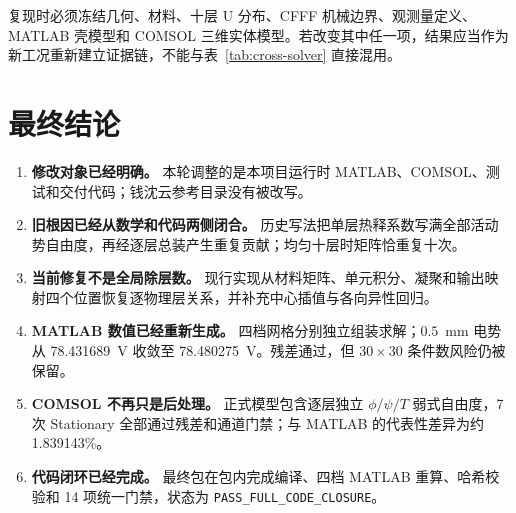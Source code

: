 \documentclass[UTF8,fontset=windows,12pt,a4paper]{ctexart}
\begin{document}
复现时必须冻结几何、材料、十层 U 分布、CFFF 机械边界、观测量定义、MATLAB 壳模型和 COMSOL 三维实体模型。若改变其中任一项，结果应当作为新工况重新建立证据链，不能与表~\ref{tab:cross-solver} 直接混用。

\section{最终结论}

\begin{enumerate}[leftmargin=2.7em]
  \item \textbf{修改对象已经明确。} 本轮调整的是本项目运行时 MATLAB、COMSOL、测试和交付代码；钱沈云参考目录没有被改写。
  \item \textbf{旧根因已经从数学和代码两侧闭合。} 历史写法把单层热释系数写满全部活动势自由度，再经逐层总装产生重复贡献；均匀十层时矩阵恰重复十次。
  \item \textbf{当前修复不是全局除层数。} 现行实现从材料矩阵、单元积分、凝聚和输出映射四个位置恢复逐物理层关系，并补充中心插值与各向异性回归。
  \item \textbf{MATLAB 数值已经重新生成。} 四档网格分别独立组装求解；$0.5$~mm 电势从 78.431689~V 收敛至 78.480275~V。残差通过，但 $30\times30$ 条件数风险仍被保留。
  \item \textbf{COMSOL 不再只是后处理。} 正式模型包含逐层独立 $\phi/\psi/T$ 弱式自由度，7 次 Stationary 全部通过残差和通道门禁；与 MATLAB 的代表性差异为约 1.839143\%。
  \item \textbf{代码闭环已经完成。} 最终包在包内完成编译、四档 MATLAB 重算、哈希校验和 14 项统一门禁，状态为 \texttt{PASS\_FULL\_CODE\_CLOSURE}。
\end{enumerate}

\begin{center}
\end{center}
\end{document}
